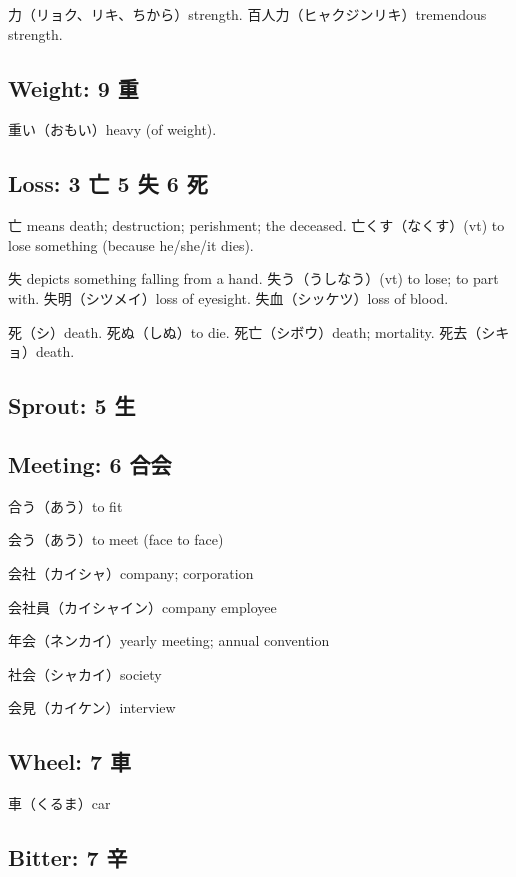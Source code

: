 力（リョク、リキ、ちから）strength.
百人力（ヒャクジンリキ）tremendous strength.

\subsection{Weight: 9 重}

重い（おもい）heavy (of weight).

\subsection{Loss: 3 亡 5 失 6 死}

亡 means death; destruction; perishment; the deceased.
亡くす（なくす）(vt) to lose something (because he/she/it dies).

失 depicts something falling from a hand.
失う（うしなう）(vt) to lose; to part with.
失明（シツメイ）loss of eyesight.
失血（シッケツ）loss of blood.

死（シ）death.
死ぬ（しぬ）to die.
死亡（シボウ）death; mortality.
死去（シキョ）death.

\subsection{Sprout: 5 生}

\subsection{Meeting: 6 合会}

合う（あう）to fit

会う（あう）to meet (face to face)

会社（カイシャ）company; corporation

会社員（カイシャイン）company employee

年会（ネンカイ）yearly meeting; annual convention

社会（シャカイ）society

会見（カイケン）interview

\subsection{Wheel: 7 車}

車（くるま）car

\subsection{Bitter: 7 辛}

